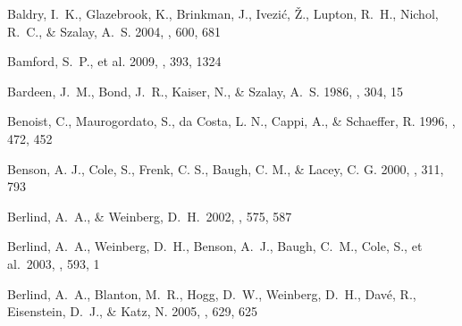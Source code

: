 \documentclass[]{emulateapj}
\begin{document}
\begin{thebibliography}{999}
Baldry, I.\ K., Glazebrook, K., Brinkman, J., Ivezi\'{c}, \v{Z}., 
Lupton, R.\ H., Nichol, R.\ C., \& Szalay, A.\ S. 2004, \apj, 600, 681

Bamford, S.\ P., et al. 2009, \mnras, 393, 1324

Bardeen, J.\ M., Bond, J.\ R., Kaiser, N., \& Szalay, A.\ S. 1986,
\apj, 304, 15


Benoist, C., Maurogordato, S., da Costa, L. N., Cappi, A., 
\& Schaeffer, R. 1996, \apj, 472, 452

Benson, A. J., Cole, S., Frenk, C. S., Baugh, C. M., \& Lacey, C. G. 2000,
\mnras, 311, 793

Berlind, A.\ A., \& Weinberg, D.\ H.\ 2002, 
\apj, 575, 587

Berlind, A.\ A.,  Weinberg, D.\ H., Benson, A.\ J., Baugh, C.\ M., Cole, S.,
et al.\ 2003, 
\apj, 593, 1

Berlind, A.\ A., Blanton, M.\ R., Hogg, D.\ W., Weinberg, D.\ H., 
Dav{\'e}, R., Eisenstein, D.\ J., \& Katz, N. 2005, 
\apj, 629, 625  %




\end{thebibliography}
\end{document}
